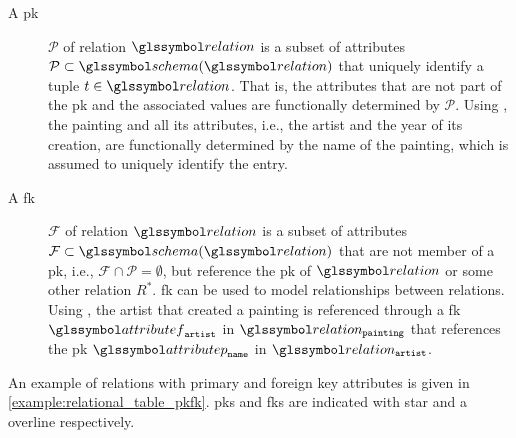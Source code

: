 \begin{description}
    \item[A \acrfull{pk}] $\mathcal{P}$ of relation $\relation$ is a subset of attributes $\mathcal{P} \subset \schema(\relation)$ that uniquely identify a tuple $t \in \relation$. That is, the attributes that are not part of the \acrshort{pk} and the associated values are functionally determined by $\mathcal{P}$. Using , the painting and all its attributes, i.e., the artist and the year of its creation, are functionally determined by the name of the painting, which is assumed to uniquely identify the entry.
 
    \item[A \acrfull{fk}] $\mathcal{F}$ of relation $\relation$ is a subset of attributes $\mathcal{F} \subset \schema(\relation)$ that are not member of a \acrshort{pk}, i.e., $ \mathcal{F} \cap \mathcal{P} = \emptyset$, but reference the \acrshort{pk} of $\relation$ or some other relation $R^{*}$. \acrshort{fk} can be used to model relationships between relations. Using , the artist that created a painting is referenced through a \acrshort{fk} $\attributef_{\mathtt{artist}}$ in $\relation_{\mathtt{painting}}$ that references the \acrshort{pk} $\attributep_{\mathtt{name}}$ in $\relation_{\mathtt{artist}}$.
\end{description}

An example of relations with primary and foreign key attributes is given in \cref{example:relational_table_pkfk}. \acrshort{pk}s and \acrshort{fk}s are indicated with star and a overline respectively.

